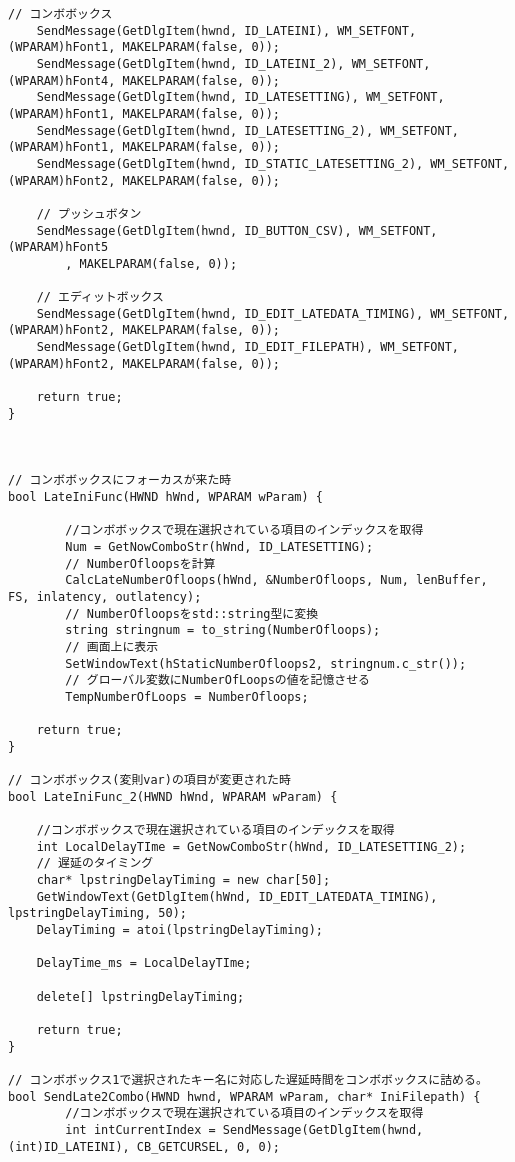 \begin{lstlisting}[caption=main.cpp]
	// コンボボックス
	SendMessage(GetDlgItem(hwnd, ID_LATEINI), WM_SETFONT, (WPARAM)hFont1, MAKELPARAM(false, 0));
	SendMessage(GetDlgItem(hwnd, ID_LATEINI_2), WM_SETFONT, (WPARAM)hFont4, MAKELPARAM(false, 0));
	SendMessage(GetDlgItem(hwnd, ID_LATESETTING), WM_SETFONT, (WPARAM)hFont1, MAKELPARAM(false, 0));
	SendMessage(GetDlgItem(hwnd, ID_LATESETTING_2), WM_SETFONT, (WPARAM)hFont1, MAKELPARAM(false, 0));
	SendMessage(GetDlgItem(hwnd, ID_STATIC_LATESETTING_2), WM_SETFONT, (WPARAM)hFont2, MAKELPARAM(false, 0));

	// プッシュボタン
	SendMessage(GetDlgItem(hwnd, ID_BUTTON_CSV), WM_SETFONT, (WPARAM)hFont5
		, MAKELPARAM(false, 0));
	
	// エディットボックス
	SendMessage(GetDlgItem(hwnd, ID_EDIT_LATEDATA_TIMING), WM_SETFONT, (WPARAM)hFont2, MAKELPARAM(false, 0));
	SendMessage(GetDlgItem(hwnd, ID_EDIT_FILEPATH), WM_SETFONT, (WPARAM)hFont2, MAKELPARAM(false, 0));

	return true;
}



// コンボボックスにフォーカスが来た時
bool LateIniFunc(HWND hWnd, WPARAM wParam) {

		//コンボボックスで現在選択されている項目のインデックスを取得
		Num = GetNowComboStr(hWnd, ID_LATESETTING);
		// NumberOfloopsを計算
		CalcLateNumberOfloops(hWnd, &NumberOfloops, Num, lenBuffer, FS, inlatency, outlatency);
		// NumberOfloopsをstd::string型に変換
		string stringnum = to_string(NumberOfloops);
		// 画面上に表示
		SetWindowText(hStaticNumberOfloops2, stringnum.c_str());
		// グローバル変数にNumberOfLoopsの値を記憶させる
		TempNumberOfLoops = NumberOfloops;

	return true;
}

// コンボボックス(変則var)の項目が変更された時
bool LateIniFunc_2(HWND hWnd, WPARAM wParam) {

	//コンボボックスで現在選択されている項目のインデックスを取得
	int LocalDelayTIme = GetNowComboStr(hWnd, ID_LATESETTING_2);
	// 遅延のタイミング
	char* lpstringDelayTiming = new char[50];
	GetWindowText(GetDlgItem(hWnd, ID_EDIT_LATEDATA_TIMING), lpstringDelayTiming, 50);
	DelayTiming = atoi(lpstringDelayTiming);

	DelayTime_ms = LocalDelayTIme;

	delete[] lpstringDelayTiming;

	return true;
}

// コンボボックス1で選択されたキー名に対応した遅延時間をコンボボックスに詰める。
bool SendLate2Combo(HWND hwnd, WPARAM wParam, char* IniFilepath) {
		//コンボボックスで現在選択されている項目のインデックスを取得
		int intCurrentIndex = SendMessage(GetDlgItem(hwnd, (int)ID_LATEINI), CB_GETCURSEL, 0, 0);


\end{lstlisting}
